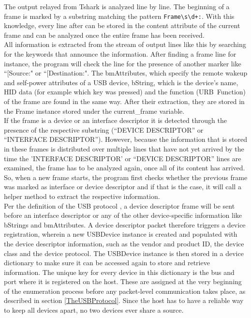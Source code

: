 The output relayed from Tshark is analyzed line by line. The beginning of a frame is marked by a substring matching the pattern \verb|Frame\s\d+:|. With this knowledge, every line after can be stored in the content attribute of the current frame and can be analyzed once the entire frame has been received. \\ 
All information is extracted from the stream of output lines like this by searching for the keywords that announce the information. After finding a frame line for instance, the program will check the line for the presence of another marker like ``[Source:" or ``[Destination:". The bmAttributes, which specify the remote wakeup and self-power attributes of a USB device, bString, which is the device's name, HID data (for example which key was pressed) and the function (URB\ Function) of the frame are found in the same way. After their extraction, they are stored in the Frame instance stored under the current\_frame variable. \\
If the frame is a device or an interface descriptor it is detected through the presence of the respective substring (``DEVICE DESCRIPTOR'' or ``INTERFACE DESCRIPTOR''). However, because the information that is stored in these frames is distributed over multiple lines that have not yet arrived by the time the 'INTERFACE DESCRIPTOR' or ``DEVICE DESCRIPTOR''  lines are examined, the frame has to be analyzed again, once all of its content has arrived. So, when a new frame starts, the program first checks whether the previous frame was marked as interface or device descriptor and if that is the case, it will call a helper method to extract the respective information. \\
Per the definition of the USB protocol \cite{WaybackMachine2018}, a device descriptor frame will be sent before an interface descriptor or any of the other device-specific information like bStrings and bmAttributes. A device descriptor packet therefore triggers a device registration, wherein a new USBDevice instance is created and populated with the device descriptor information, such as the vendor and product ID, the device class and the device protocol. The USBDevice instance is then stored in a device dictionary to make sure it can be accessed again to store and retrieve information. The unique key for every device in this dictionary is the bus and port where it is registered on the host. These are assigned at the very beginning of the enumeration process before any packet-level communication takes place, as described in section \ref{TheUSBProtocol}. Since the host has to have a reliable way to keep all devices apart, no two devices ever share a source. \\
